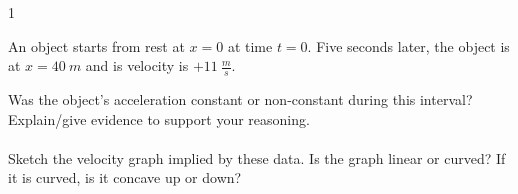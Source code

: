 
\AddToShipoutPicture*{\BackgroundPic}

\addtocounter {ProbNum} {1}

 
{\bf \Large{}} An object starts from rest at $x=0$ at time $t=0$. Five seconds later, the object is at $x=40~m$ and is velocity is ${+11~\tfrac{m}{s}}$. \bigskip

Was the object's acceleration constant or non-constant during this interval? Explain/give evidence to support your reasoning.
\paragraph{}
\noindent
\vfill

Sketch the velocity graph implied by these data. Is the graph linear or curved? If it is curved, is it concave up or down?
\vfill




\newpage